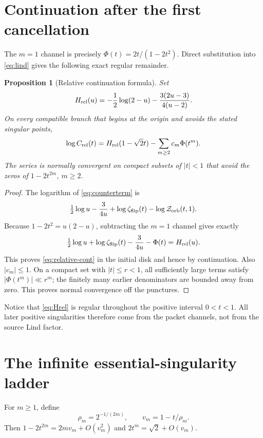 \documentclass[11pt]{article}
\newtheorem{proposition}[theorem]{Proposition}
\newcommand{\Zorb}{\mathcal Z_{\rm orb}}
\newcommand{\zflip}{\zeta_{\rm flip}}
\newcommand{\PhiF}{\Phi}
\begin{document}
\section{Continuation after the first cancellation}

The $m=1$ channel is precisely
\(\PhiF(t)=2t/(1-2t^2)\).  Direct substitution into \eqref{eq:lind} gives
the following exact regular remainder.

\begin{proposition}[Relative continuation formula]\label{prop:relative}
Set
\begin{equation}\label{eq:Hrel}
 H_{\rm rel}(u)=-\frac12\log(2-u)
 -\frac{3(2u-3)}{4(u-2)}.
\end{equation}
On every compatible branch that begins at the origin and avoids the stated
singular points,
\begin{equation}\label{eq:relative-cont}
 \log C_{\rm rel}(t)=H_{\rm rel}(1-\sqrt2t)
 -\sum_{m\ge2}c_m\PhiF(t^m).
\end{equation}
The series is normally convergent on compact subsets of $|t|<1$ that avoid
the zeros of $1-2t^{2m}$, $m\ge2$.
\end{proposition}

\begin{proof}
The logarithm of \eqref{eq:counterterm} is
\[
 \tfrac12\log u-\frac{3}{4u}+\log\zflip(t)
 -\log\Zorb(t,1).
\]
Because $1-2t^2=u(2-u)$, subtracting the $m=1$ channel gives exactly
\[
 \tfrac12\log u+\log\zflip(t)-\frac{3}{4u}-\PhiF(t)
 =H_{\rm rel}(u).
\]
This proves \eqref{eq:relative-cont} in the initial disk and hence by
continuation.  Also $|c_m|\le1$.  On a compact set with $|t|\le r<1$, all
sufficiently large terms satisfy $|\PhiF(t^m)|\ll r^m$; the finitely many
earlier denominators are bounded away from zero.  This proves normal
convergence off the punctures.
\end{proof}

Notice that \eqref{eq:Hrel} is regular throughout the positive interval
$0<t<1$.  All later positive singularities therefore come from the packet
channels, not from the source Lind factor.

\section{The infinite essential-singularity ladder}

For $m\ge1$, define
\begin{equation}\label{eq:rho}
 \rho_m=2^{-1/(2m)},\qquad v_m=1-t/\rho_m.
\end{equation}
Then $1-2t^{2m}=2mv_m+O(v_m^2)$ and
$2t^m=\sqrt2+O(v_m)$.
\end{document}
